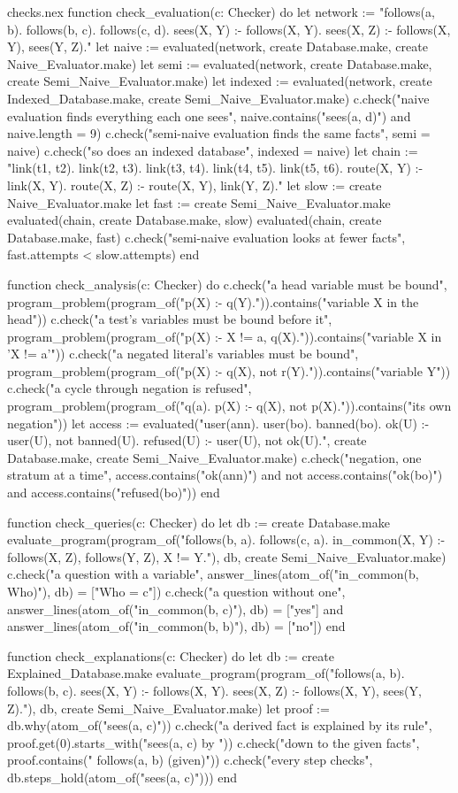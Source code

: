 \begin{continued}{checks.nex}
function check_evaluation(c: Checker)
do
  let network := "follows(a, b). follows(b, c). follows(c, d).
sees(X, Y) :- follows(X, Y).
sees(X, Z) :- follows(X, Y), sees(Y, Z)."
  let naive := evaluated(network, create Database.make, create Naive_Evaluator.make)
  let semi := evaluated(network, create Database.make, create Semi_Naive_Evaluator.make)
  let indexed := evaluated(network, create Indexed_Database.make, create Semi_Naive_Evaluator.make)
  c.check("naive evaluation finds everything each one sees", naive.contains("sees(a, d)") and naive.length = 9)
  c.check("semi-naive evaluation finds the same facts", semi = naive)
  c.check("so does an indexed database", indexed = naive)
  let chain := "link(t1, t2). link(t2, t3). link(t3, t4). link(t4, t5). link(t5, t6).
route(X, Y) :- link(X, Y).
route(X, Z) :- route(X, Y), link(Y, Z)."
  let slow := create Naive_Evaluator.make
  let fast := create Semi_Naive_Evaluator.make
  evaluated(chain, create Database.make, slow)
  evaluated(chain, create Database.make, fast)
  c.check("semi-naive evaluation looks at fewer facts", fast.attempts < slow.attempts)
end

function check_analysis(c: Checker)
do
  c.check("a head variable must be bound",
    program_problem(program_of("p(X) :- q(Y).")).contains("variable X in the head"))
  c.check("a test's variables must be bound before it",
    program_problem(program_of("p(X) :- X != a, q(X).")).contains("variable X in 'X != a'"))
  c.check("a negated literal's variables must be bound",
    program_problem(program_of("p(X) :- q(X), not r(Y).")).contains("variable Y"))
  c.check("a cycle through negation is refused",
    program_problem(program_of("q(a). p(X) :- q(X), not p(X).")).contains("its own negation"))
  let access := evaluated("user(ann). user(bo). banned(bo).
ok(U) :- user(U), not banned(U).
refused(U) :- user(U), not ok(U).", create Database.make, create Semi_Naive_Evaluator.make)
  c.check("negation, one stratum at a time", access.contains("ok(ann)")
    and not access.contains("ok(bo)") and access.contains("refused(bo)"))
end

function check_queries(c: Checker)
do
  let db := create Database.make
  evaluate_program(program_of("follows(b, a). follows(c, a).
in_common(X, Y) :- follows(X, Z), follows(Y, Z), X != Y."), db, create Semi_Naive_Evaluator.make)
  c.check("a question with a variable", answer_lines(atom_of("in_common(b, Who)"), db) = ["Who = c"])
  c.check("a question without one", answer_lines(atom_of("in_common(b, c)"), db) = ["yes"]
    and answer_lines(atom_of("in_common(b, b)"), db) = ["no"])
end

function check_explanations(c: Checker)
do
  let db := create Explained_Database.make
  evaluate_program(program_of("follows(a, b). follows(b, c).
sees(X, Y) :- follows(X, Y).
sees(X, Z) :- follows(X, Y), sees(Y, Z)."), db, create Semi_Naive_Evaluator.make)
  let proof := db.why(atom_of("sees(a, c)"))
  c.check("a derived fact is explained by its rule", proof.get(0).starts_with("sees(a, c)    by "))
  c.check("down to the given facts", proof.contains("  follows(a, b)    (given)"))
  c.check("every step checks", db.steps_hold(atom_of("sees(a, c)")))
end
\end{continued}

